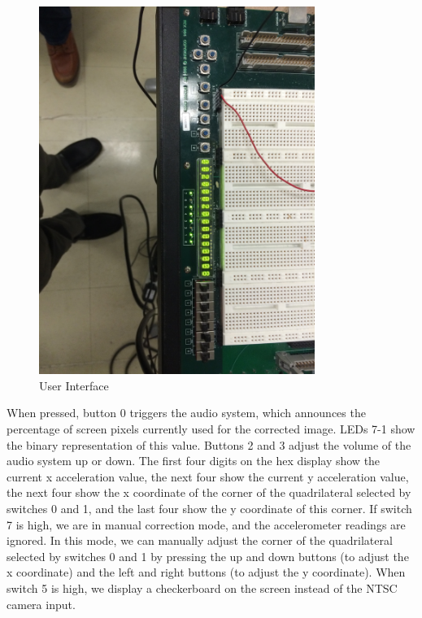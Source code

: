 \documentclass{article}
\begin{document}
\begin{center}
\begin{figure}[H]
\label{fig:ui}
\caption{User Interface}
\centering
\includegraphics[width=0.8\textwidth, angle=90]{./img/ui}
\end{figure}
\end{center}

When pressed, button 0 triggers the audio system, which announces the percentage of screen pixels currently used for the corrected image.
LEDs 7-1 show the binary representation of this value.
Buttons 2 and 3 adjust the volume of the audio system up or down.
The first four digits on the hex display show the current x acceleration value,
the next four show the current y acceleration value,
the next four show the x coordinate of the corner of the quadrilateral selected by switches 0 and 1,
and the last four show the y coordinate of this corner.
If switch 7 is high, we are in manual correction mode,
and the accelerometer readings are ignored.
In this mode, we can manually adjust the corner of the quadrilateral selected by switches 0 and 1 by pressing the up and down buttons (to adjust the x coordinate) and the left and right buttons (to adjust the y coordinate).
When switch 5 is high, we display a checkerboard on the screen instead of the NTSC camera input.
\end{document}
